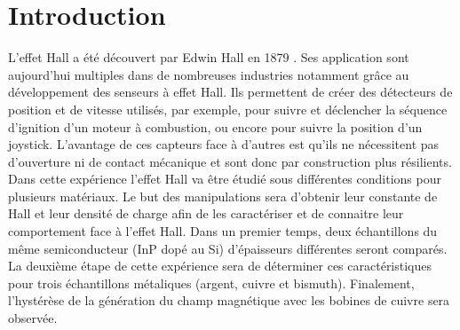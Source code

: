 \section{Introduction}

L'effet Hall a été découvert par Edwin Hall en 1879 \cite{hall}. Ses application sont aujourd'hui multiples dans de nombreuses industries notamment grâce au développement des senseurs à effet Hall. Ils permettent de créer des détecteurs de position et de vitesse utilisés, par exemple, pour suivre et déclencher la séquence d'ignition d'un moteur à combustion, ou encore pour suivre la position d'un joystick. L'avantage de ces capteurs face à d'autres est qu'ils ne nécessitent pas d'ouverture ni de contact mécanique et sont donc par construction plus résilients. \cite{hall_applications}\\
Dans cette expérience l'effet Hall va être étudié sous différentes conditions pour plusieurs matériaux. Le but des manipulations sera d'obtenir leur constante de Hall et leur densité de charge afin de les caractériser et de connaitre leur comportement face à l'effet Hall. Dans un premier temps, deux échantillons du même semiconducteur (InP dopé au Si) d'épaisseurs différentes seront comparés. La deuxième étape de cette expérience sera de déterminer ces caractéristiques pour trois échantillons métaliques (argent, cuivre et bismuth). Finalement, l'hystérèse de la génération du champ magnétique avec les bobines de cuivre sera observée.
